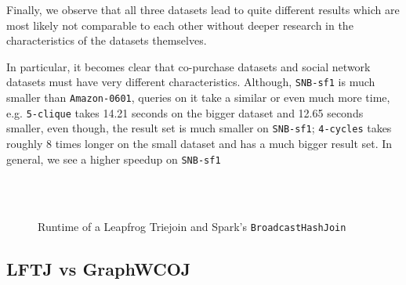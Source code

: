Finally, we observe that all three datasets lead to quite different results which are most likely not comparable to each other without deeper research
in the characteristics of the datasets themselves.

In particular, it becomes clear that co-purchase datasets and social network datasets must have very different characteristics.
Although, \texttt{SNB-sf1} is much smaller than \texttt{Amazon-0601}, queries on it take a similar or even much more time,
e.g. \texttt{5-clique} takes 14.21 seconds on the bigger dataset and 12.65 seconds smaller, even though, the result set is much
smaller on \texttt{SNB-sf1};
\texttt{4-cycles} takes roughly 8 times longer on the small dataset and has a much bigger result set.
In general, we see a higher speedup on \texttt{SNB-sf1}

\begin{figure}
    \centering
    \subfloat[Amazon0302]{
        
        
    }\\
    \subfloat[Amazon0601]{
        
        
    }\\
    \subfloat[SNB-sf-1]{
        
        
    }
    \caption{Runtime of a Leapfrog Triejoin and Spark's \texttt{BroadcastHashJoin}}
    \label{fig:spark-vs-lftj}
\end{figure}


%
%    
%
%    
%
%    

\subsection{\textsc{LFTJ} vs GraphWCOJ} \label{subsec:lftj-vs-graphWCOJ}

